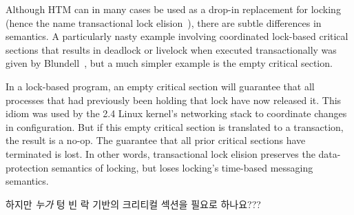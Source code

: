 Although HTM can in many cases be used as a drop-in replacement for locking
(hence the name transactional lock
elision~\cite{DaveDice2008TransactLockElision}),
there are subtle differences in semantics.
A particularly nasty example involving coordinated lock-based critical
sections that results in deadlock or livelock when executed transactionally
was given by Blundell~\cite{Blundell2006TMdeadlock}, but a much simpler
example is the empty critical section.

In a lock-based program, an empty critical section will guarantee
that all processes that had previously been holding that lock have
now released it.
This idiom was used by the 2.4 Linux kernel's networking stack to
coordinate changes in configuration.
But if this empty critical section is translated to a transaction,
the result is a no-op.
The guarantee that all prior critical sections have terminated is
lost.
In other words, transactional lock elision preserves the data-protection
semantics of locking, but loses locking's time-based messaging semantics.
\fi

\QuickQuiz{}
	하지만 \emph{누가} 텅 빈 락 기반의 크리티컬 섹션을 필요로 하나요???
	\iffalse

